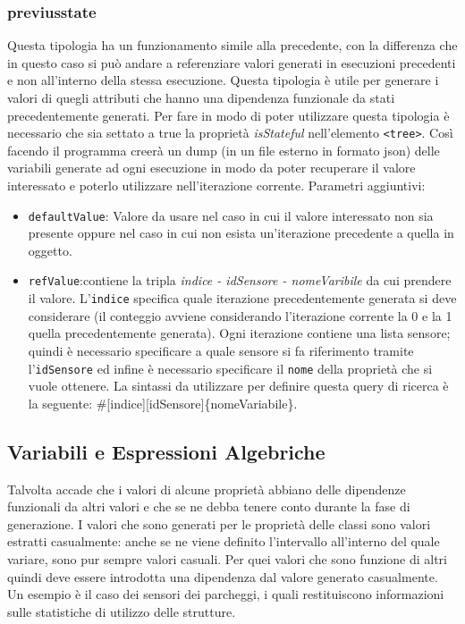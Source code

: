 \documentclass[12pt,a4paper,italian]{article}
\begin{document}
\subsubsection{previusstate}\label{previusstate} Questa tipologia ha un funzionamento simile alla precedente, con la differenza che in questo caso si può andare a referenziare valori generati in esecuzioni precedenti e non all'interno della stessa esecuzione.
Questa tipologia è utile per generare i valori di quegli attributi che hanno una dipendenza funzionale da stati precedentemente generati. Per fare in modo di poter utilizzare questa tipologia è necessario che sia settato a true la proprietà 
\emph{isStateful} nell'elemento \texttt{<tree>}. Così facendo il programma creerà un dump (in un file esterno in formato json) delle variabili generate ad ogni esecuzione in modo da poter recuperare il valore interessato e poterlo
utilizzare nell'iterazione corrente.
Parametri aggiuntivi:\\
\begin{itemize}
	\item \texttt{defaultValue}: Valore da usare nel caso in cui il valore interessato non sia presente oppure nel caso in cui non esista un'iterazione precedente a quella in oggetto.
	\item \texttt{refValue}:contiene la tripla \emph{indice - idSensore - nomeVaribile} da cui prendere il valore. L'\texttt{indice} specifica quale iterazione precedentemente generata si deve considerare (il conteggio avviene considerando l'iterazione corrente la 0 e la 1 quella precedentemente generata).
Ogni iterazione contiene una lista sensore; quindi è necessario specificare a quale sensore si fa riferimento tramite l'\texttt{idSensore} ed infine è necessario specificare il \texttt{nome} della proprietà che si vuole ottenere.
La sintassi da utilizzare per definire questa query di ricerca è la seguente: \#[indice][idSensore]\{nomeVariabile\}.\\
	\end{itemize}
	
\subsection{Variabili e Espressioni Algebriche}
Talvolta accade che i valori di alcune proprietà abbiano delle dipendenze funzionali da altri valori e che se ne debba tenere conto durante la fase di generazione.
I valori che sono generati per le proprietà delle classi sono valori estratti casualmente: anche se ne viene definito l'intervallo all'interno del quale variare, sono pur sempre valori casuali. 
Per quei valori che sono funzione di altri quindi deve essere introdotta una dipendenza dal valore generato casualmente.\\
Un esempio è il caso dei sensori dei parcheggi, i quali restituiscono informazioni sulle statistiche di utilizzo delle strutture. 
\end{document}
